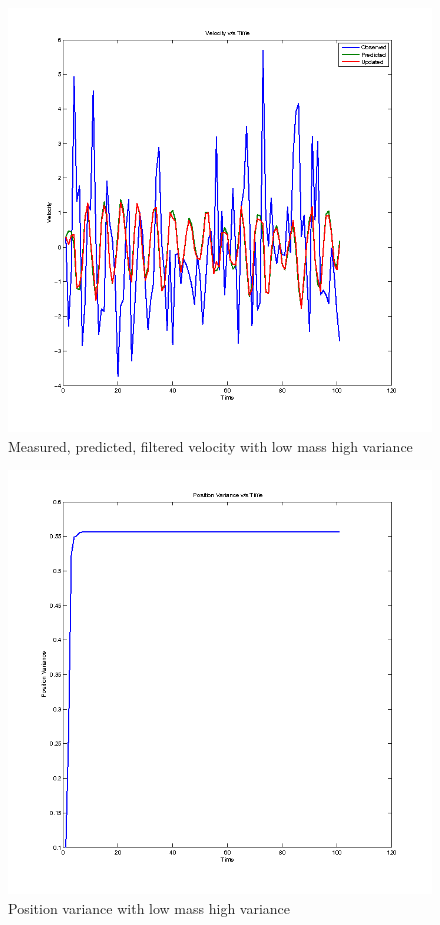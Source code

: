 \documentclass[12pt]{article}
\begin{document}
\begin{figure}
    \includegraphics[width=\linewidth]{kalman-velocity-m1h}
    \caption{Measured, predicted, filtered velocity with low mass high variance}
\end{figure}

\begin{figure}
    \includegraphics[width=\linewidth]{kalman-variance1-m1h}
    \caption{Position variance with low mass high variance}
\end{figure}
\end{document}
